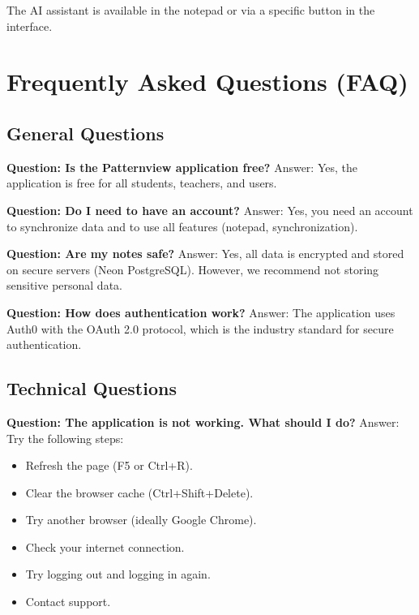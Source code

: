 The AI assistant is available in the notepad or via a specific button in the interface.

\section{Frequently Asked Questions (FAQ)}

\subsection{General Questions}

\textbf{Question: Is the Patternview application free?}\newline
Answer: Yes, the application is free for all students, teachers, and users.

\textbf{Question: Do I need to have an account?}\newline
Answer: Yes, you need an account to synchronize data and to use all features (notepad, synchronization).

\textbf{Question: Are my notes safe?}\newline
Answer: Yes, all data is encrypted and stored on secure servers (Neon PostgreSQL). However, we recommend not storing sensitive personal data.

\textbf{Question: How does authentication work?}\newline
Answer: The application uses Auth0 with the OAuth 2.0 protocol, which is the industry standard for secure authentication.

\subsection{Technical Questions}

\textbf{Question: The application is not working. What should I do?}\newline
Answer: Try the following steps:
\begin{itemize}
  \item Refresh the page (F5 or Ctrl+R).
  \item Clear the browser cache (Ctrl+Shift+Delete).
  \item Try another browser (ideally Google Chrome).
  \item Check your internet connection.
  \item Try logging out and logging in again.
  \item Contact support.
\end{itemize}

